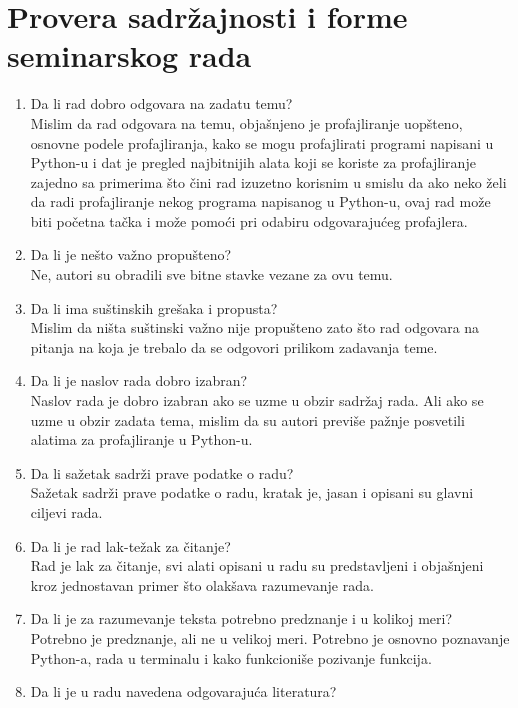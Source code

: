 \documentclass[a4paper]{report}
\begin{document}
\section{Provera sadržajnosti i forme seminarskog rada}

\begin{enumerate}
\item Da li rad dobro odgovara na zadatu temu?\\
Mislim da rad odgovara na temu, objašnjeno je profajliranje uopšteno, osnovne podele profajliranja, kako se mogu profajlirati programi napisani u Python-u i dat je pregled najbitnijih alata koji se koriste za profajliranje zajedno sa primerima što čini rad izuzetno korisnim u smislu da ako neko želi da radi profajliranje nekog programa napisanog u Python-u, ovaj rad može biti početna tačka i može pomoći pri odabiru odgovarajućeg profajlera.
\item Da li je nešto važno propušteno?\\
Ne, autori su obradili sve bitne stavke vezane za ovu temu. 
\item Da li ima suštinskih grešaka i propusta?\\
Mislim da ništa suštinski važno nije propušteno zato što rad odgovara na pitanja na koja je trebalo da se odgovori prilikom zadavanja teme.
\item Da li je naslov rada dobro izabran?\\
Naslov rada je dobro izabran ako se uzme u obzir sadržaj rada. Ali ako se uzme u obzir zadata tema, mislim da su autori previše pažnje posvetili alatima za profajliranje u Python-u.
\item Da li sažetak sadrži prave podatke o radu?\\
Sažetak sadrži prave podatke o radu, kratak je, jasan i opisani su glavni ciljevi rada.
\item Da li je rad lak-težak za čitanje?\\
Rad je lak za čitanje, svi alati opisani u radu su predstavljeni i objašnjeni kroz jednostavan primer što olakšava razumevanje rada.
\item Da li je za razumevanje teksta potrebno predznanje i u kolikoj meri?\\
Potrebno je predznanje, ali ne u velikoj meri. Potrebno je osnovno poznavanje Python-a, rada u terminalu i kako funkcioniše pozivanje funkcija.
\item Da li je u radu navedena odgovarajuća literatura?\\

\end{enumerate}
\end{document}

